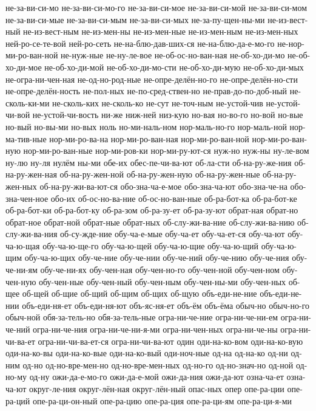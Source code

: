 {не-за-ви-си-мо
не-за-ви-си-мо-го
не-за-ви-си-мое
не-за-ви-си-мой
не-за-ви-си-мом
не-за-ви-си-мые
не-за-ви-си-мым
не-за-ви-си-мых
не-за-пу-щен-ны-ми
не-из-вест-ный
не-из-вест-ным
не-из-мен-ны
не-из-мен-ные
не-из-мен-ным
не-из-мен-ных
ней-ро-се-те-вой
ней-ро-сеть
не-на-блю-дав-ших-ся
не-на-блю-да-е-мо-го
не-нор-ми-ро-ван-ной
не-нуж-ные
не-ну-ле-вое
не-об-ос-но-ван-ная
не-об-хо-ди-мо
не-об-хо-ди-мое
не-об-хо-ди-мой
не-об-хо-ди-мо-сти
не-об-хо-ди-мую
не-об-хо-ди-мых
не-огра-ни-чен-ная
не-од-но-род-ные
не-опре-делён-но-го
не-опре-делён-но-сти
не-опре-делён-ность
не-пол-ных
не-по-сред-ствен-но
не-прав-до-по-доб-ный
не-сколь-ки-ми
не-сколь-ких
не-сколь-ко
не-сут
не-точ-ным
не-устой-чив
не-устой-чи-вой
не-устой-чи-вость
ни-же
ниж-ней
низ-кую
но-вая
но-во-го
но-вой
но-вые
но-вый
но-вы-ми
но-вых
ноль
но-ми-наль-ном
нор-маль-но-го
нор-маль-ной
нор-ма-тив-ные
нор-ми-ро-ва-на
нор-ми-ро-ван-ная
нор-ми-ро-ван-ной
нор-ми-ро-ван-ную
нор-ми-ро-ван-ные
нор-ми-ров-ки
нор-ми-ру-ют-ся
нуж-но
нуж-ны
ну-ле-вом
ну-лю
ну-ля
нулём
ны-ми
обе-их
обес-пе-чи-ва-ют
об-ла-сти
об-на-ру-же-ния
об-на-ру-жен-ная
об-на-ру-жен-ной
об-на-ру-жен-ную
об-на-ру-жен-ные
об-на-ру-жен-ных
об-на-ру-жи-ва-ют-ся
обо-зна-ча-е-мое
обо-зна-ча-ют
обо-зна-че-на
обо-зна-чен-ное
обо-их
об-ос-но-ва-ние
об-ос-но-ван-ные
об-ра-бот-ка
об-ра-бот-ке
об-ра-бот-ки
об-ра-бот-ку
об-ра-зом
об-ра-зу-ет
об-ра-зу-ют
обрат-ная
обрат-но
обрат-ное
обрат-ной
обрат-ные
обрат-ных
об-слу-жи-ва-ние
об-слу-жи-ва-нию
об-слу-жи-ва-ния
об-су-жде-ние
обу-ча-е-мые
обу-ча-ет
обу-ча-ет-ся
обу-ча-ют
обу-ча-ю-щая
обу-ча-ю-ще-го
обу-ча-ю-щей
обу-ча-ю-щие
обу-ча-ю-щий
обу-ча-ю-щим
обу-ча-ю-щих
обу-че-ние
обу-че-нии
обу-че-ний
обу-че-нию
обу-че-ния
обу-че-ни-ям
обу-че-ни-ях
обу-чен-ная
обу-чен-но-го
обу-чен-ной
обу-чен-ном
обу-чен-ную
обу-чен-ные
обу-чен-ный
обу-чен-ным
обу-чен-ны-ми
обу-чен-ных
об-щее
об-щей
об-щие
об-щий
об-щим
об-щих
об-щую
объ-еди-не-ние
объ-еди-не-нии
объ-еди-ня-ет
объ-еди-ня-ют
объ-яс-ня-ет
объ-ём
объ-ёма
обыч-но
обыч-но-го
обыч-ной
обя-за-тель-но
обя-за-тель-ные
огра-ни-че-ние
огра-ни-че-ни-ем
огра-ни-че-ний
огра-ни-че-ния
огра-ни-че-ни-я-ми
огра-ни-чен-ных
огра-ни-че-ны
огра-ни-чи-ва-ет
огра-ни-чи-ва-ет-ся
огра-ни-чи-ва-ют
один
оди-на-ко-вом
оди-на-ко-вую
оди-на-ко-вы
оди-на-ко-вые
оди-на-ко-вый
оди-ноч-ные
од-на
од-на-ко
од-ни
од-ним
од-но
од-но-вре-мен-но
од-но-вре-мен-ных
од-но-го
од-но-знач-но
од-ной
од-но-му
од-ну
ожи-да-е-мо-го
ожи-да-е-мой
ожи-да-ния
ожи-да-ют
озна-ча-ет
озна-ча-ют
округ-ле-ния
округ-лён-ная
округ-лён-ный
опас-ных
опер
опе-ра-ции
опе-ра-ций
опе-ра-ци-он-ный
опе-ра-цию
опе-ра-ция
опе-ра-ци-ям
опе-ра-ци-я-ми
}

